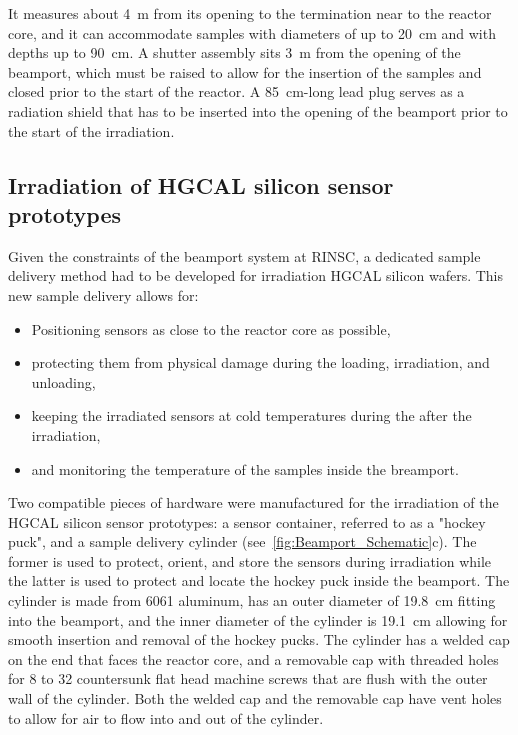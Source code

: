 It measures about \SI{4}{\metre} from its opening to the termination near to the reactor core, and it can accommodate samples with diameters of up to \SI{20}{\centi\metre} and with depths up to \SI{90}{\centi\metre}.
A shutter assembly sits \SI{3}{\metre} from the opening of the beamport, which must be raised to allow for the insertion of the samples and closed prior to the start of the reactor.
A \SI{85}{\centi\metre}-long lead plug serves as a radiation shield that has to be inserted into the opening of the beamport prior to the start of the irradiation.

\subsection{Irradiation of HGCAL silicon sensor prototypes}
\label{subsec:irradiation}
Given the constraints of the beamport system at RINSC, a dedicated sample delivery method had to be developed for irradiation HGCAL silicon wafers.
This new sample delivery allows for:
\begin{itemize}
  \item Positioning sensors as close to the reactor core as possible,
  \item protecting them from physical damage during the loading, irradiation, and unloading,
  \item keeping the irradiated sensors at cold temperatures during the after the irradiation,
  \item and monitoring the temperature of the samples inside the breamport.
\end{itemize}
Two compatible pieces of hardware were manufactured for the irradiation of the HGCAL silicon sensor prototypes: a sensor container, referred to as a "hockey puck", and a sample delivery cylinder (see~\ref{fig:Beamport_Schematic}c). 
The former is used to protect, orient, and store the sensors during irradiation while the latter is used to protect and locate the hockey puck inside the beamport.
The cylinder is made from 6061 aluminum, has an outer diameter of \SI{19.8}{\centi\metre} fitting into the beamport, and the inner diameter of the cylinder is \SI{19.1}{\centi\metre} allowing for smooth insertion and removal of the hockey pucks.
The cylinder has a welded cap on the end that faces the reactor core, and a removable cap with threaded holes for 8 to 32 countersunk flat head machine screws that are flush with the outer wall of the cylinder. 
Both the welded cap and the removable cap have vent holes to allow for air to flow into and out of the cylinder.
